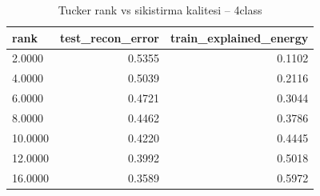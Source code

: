 \begin{table}[htbp]
  \centering
  \caption{Tucker rank vs sikistirma kalitesi -- 4class}
  \label{tab:compression_4class}
  \small
  \begin{tabular}{lrr}
    \toprule
    rank & test\_recon\_error & train\_explained\_energy \\
    \midrule
    2.0000 & 0.5355 & 0.1102 \\
    4.0000 & 0.5039 & 0.2116 \\
    6.0000 & 0.4721 & 0.3044 \\
    8.0000 & 0.4462 & 0.3786 \\
    10.0000 & 0.4220 & 0.4445 \\
    12.0000 & 0.3992 & 0.5018 \\
    16.0000 & 0.3589 & 0.5972 \\
    \bottomrule
  \end{tabular}
\end{table}
